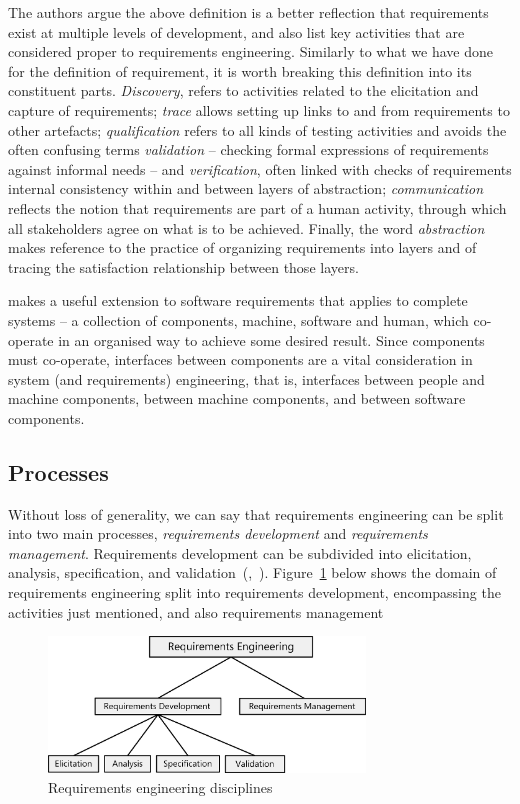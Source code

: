 \documentclass[dissertation,final]{softeng}
\begin{document}
The authors argue the above definition is a better reflection that requirements exist at multiple levels of development, and also list key activities that are considered proper to requirements engineering. Similarly to what we have done for the definition of requirement, it is worth breaking this definition into its constituent parts. \emph{Discovery}, refers to activities related to the elicitation and capture of requirements; \emph{trace} allows setting up links to and from requirements to other artefacts; \emph{qualification} refers to all kinds of testing activities and avoids the often confusing terms \emph{validation} -- checking formal expressions of requirements against informal needs -- and \emph{verification}, often linked with checks of requirements internal consistency within and between layers of abstraction; \emph{communication} reflects the notion that requirements are part of a human activity, through which all stakeholders agree on what is to be achieved. Finally, the word \emph{abstraction} makes reference to the practice of organizing requirements into layers and of tracing the satisfaction relationship between those layers.

\citet{Hull2011} makes a useful extension to software requirements that applies to complete systems -- a collection of components, machine, software and human, which co-operate in an organised way to achieve some desired result. Since components must co-operate, interfaces between components are a vital consideration in system (and requirements) engineering, that is, interfaces between people and machine components, between machine components, and between software components.

\subsection{Processes}
Without loss of generality, we can say that requirements engineering can be split into two main processes, \emph{requirements development} and \emph{requirements management}. Requirements development can be subdivided into elicitation, analysis, specification, and validation~(,~\citeyear{SWEBOK}). Figure~\ref{fig:requirements_engineering_disciplines} below shows the domain of requirements engineering split into requirements development, encompassing the activities just mentioned, and also requirements management

\begin{figure}[h]
\includegraphics[width=0.75\textwidth]{RequirementsEngineeringDisciplines}
\centering
\caption[Requirements engineering disciplines]{Requirements engineering disciplines~\citep[p. 15]{Wiegers2013}}
\label{fig:requirements_engineering_disciplines}
\end{figure}
\end{document}
